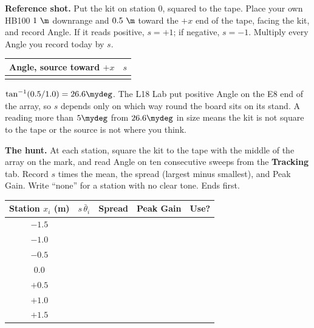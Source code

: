 \documentclass{exam}
\newif\ifkey
\newcommand{\kv}[1]{\ifkey{\color{red}#1}\fi\rule[-0.10in]{0pt}{0.34in}}
\begin{document}
\begin{questions}
\question \textbf{Reference shot.} Put the kit on station 0, squared to the tape.
Place your own HB100 $1\ \m$ downrange and $0.5\ \m$ toward the $+x$ end of the
tape, facing the kit, and record Angle. If it reads positive, $s = +1$; if
negative, $s = -1$. Multiply every Angle you record today by $s$.

\begin{center}
\renewcommand{\arraystretch}{1.25}
\begin{tabular}{| K{1.6in} | K{1.0in} |}
\hline
\textbf{Angle, source toward $+x$} & \textbf{$s$} \\\hline\hline
\kv{about $\pm 27\mydeg$} & \kv{$\pm 1$} \\\hline
\end{tabular}
\end{center}

\begin{solution}
$\tan^{-1}(0.5/1.0) = 26.6\mydeg$. The L18 Lab put positive Angle on the E8
end of the array, so $s$ depends only on which way round the board sits on its
stand. A reading more than $5\mydeg$ from $26.6\mydeg$ in size means the kit is
not square to the tape or the source is not where you think.
\end{solution}

\question \textbf{The hunt.} At each station, square the kit to the tape with the
middle of the array on the mark, and read Angle on ten consecutive sweeps
from the \textbf{Tracking} tab. Record $s$ times the mean, the spread (largest
minus smallest), and Peak Gain. Write ``none'' for a station with no clear
tone. Ends first.

\begin{center}
\small
\renewcommand{\arraystretch}{1.25}
\begin{tabular}{| c | K{1.1in} | K{0.8in} | K{1.0in} | K{0.7in} |}
\hline
\textbf{Station $x_i$ (m)} & \textbf{$s\,\bar\theta_i$} & \textbf{Spread} & \textbf{Peak Gain} & \textbf{Use?} \\\hline\hline
$-1.5$ & \kv{} & \kv{$\lesssim 2\mydeg$} & \kv{} & \kv{} \\\hline
$-1.0$ & \kv{} & \kv{$\lesssim 2\mydeg$} & \kv{} & \kv{} \\\hline
$-0.5$ & \kv{} & \kv{$\lesssim 2\mydeg$} & \kv{} & \kv{} \\\hline
$0.0$  & \kv{} & \kv{$\lesssim 2\mydeg$} & \kv{} & \kv{} \\\hline
$+0.5$ & \kv{} & \kv{$\lesssim 2\mydeg$} & \kv{} & \kv{} \\\hline
$+1.0$ & \kv{} & \kv{$\lesssim 2\mydeg$} & \kv{} & \kv{} \\\hline
$+1.5$ & \kv{} & \kv{$\lesssim 2\mydeg$} & \kv{} & \kv{} \\\hline
\end{tabular}
\end{center}


\end{questions}
\end{document}
